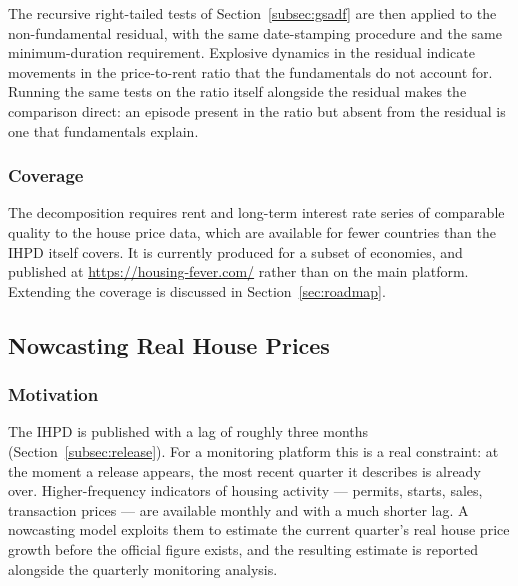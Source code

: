The recursive right-tailed tests of Section~\ref{subsec:gsadf} are then
applied to the non-fundamental residual, with the same date-stamping
procedure and the same minimum-duration requirement. Explosive dynamics in
the residual indicate movements in the price-to-rent ratio that the
fundamentals do not account for. Running the same tests on the ratio itself
alongside the residual makes the comparison direct: an episode present in the
ratio but absent from the residual is one that fundamentals explain.

\subsubsection{Coverage}

The decomposition requires rent and long-term interest rate series of
comparable quality to the house price data, which are available for fewer
countries than the IHPD itself covers. It is currently produced for a subset
of economies, and published at \url{https://housing-fever.com/} rather than
on the main platform. Extending the coverage is discussed in
Section~\ref{sec:roadmap}.

\subsection{Nowcasting Real House Prices}
\label{subsec:nowcast}

\subsubsection{Motivation}

The IHPD is published with a lag of roughly three months
(Section~\ref{subsec:release}). For a monitoring platform this is a real
constraint: at the moment a release appears, the most recent quarter it
describes is already over. Higher-frequency indicators of housing activity
--- permits, starts, sales, transaction prices --- are available monthly and
with a much shorter lag. A nowcasting model exploits them to estimate the
current quarter's real house price growth before the official figure exists,
and the resulting estimate is reported alongside the quarterly monitoring
analysis.


